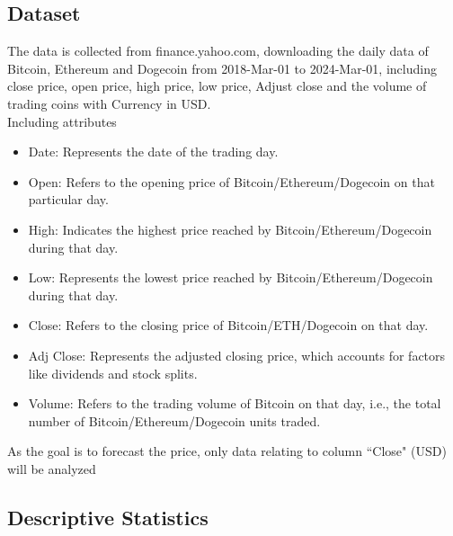 \documentclass{ieeeojies}
\begin{document}
\subsection{Dataset}
The data is collected from finance.yahoo.com, downloading the daily data of Bitcoin, Ethereum and Dogecoin from 2018-Mar-01 to 2024-Mar-01, including close price, open price, high price, low price, Adjust close and the  volume of trading coins with Currency in USD. \\
Including attributes
\begin{itemize}
    \raggedright
    \item Date: Represents the date of the trading day.
    \item Open: Refers to the opening price of Bitcoin/Ethereum/Dogecoin on that particular day.
    \item High: Indicates the highest price reached by Bitcoin/Ethereum/Dogecoin during that day.
    \item Low: Represents the lowest price reached by Bitcoin/Ethereum/Dogecoin during that day.
    \item Close: Refers to the closing price of Bitcoin/ETH/Dogecoin on that day.
    \item Adj Close: Represents the adjusted closing price, which accounts for factors like dividends and stock splits.
    \item Volume: Refers to the trading volume of Bitcoin on that day, i.e., the total number of Bitcoin/Ethereum/Dogecoin units traded.
\end{itemize}
As the goal is to forecast the price, only data relating to column “Close"
(USD) will be analyzed

\subsection{Descriptive Statistics}
\end{document}
